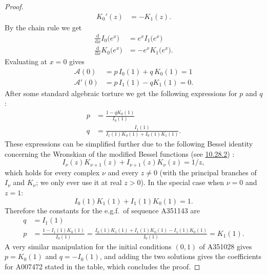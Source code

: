 \documentclass[a4paper]{amsart}
\numberwithin{equation}{section}
\begin{document}
\begin{proof}
\begin{equation}
\begin{aligned}
K_0'(z) &= -K_1(z). 
\end{aligned}
\end{equation}
%
By the chain rule we get
%
\begin{equation*}
    \begin{aligned}
        \tfrac{\mathrm{d}}{\mathrm{d}x}I_0\bigl(e^x\bigr) &= e^xI_1\bigl(e^x\bigr) \\
        \tfrac{\mathrm{d}}{\mathrm{d}x}K_0\bigl(e^x\bigr) &= -e^xK_1\bigl(e^x\bigr). 
    \end{aligned}
\end{equation*}
%
Evaluating at $x=0$ gives
%
\[
\begin{aligned}
\mathcal{A}(0) & = p \,I_0(1)+q\,K_0(1) = 1 \\
\mathcal{A}'(0) & = p\,I_1(1)-q K_1(1) = 0.
\end{aligned}
\]
%
After some standard algebraic torture we get the following expressions for $p$ and $q$:
%
\[
\begin{aligned}
p &= \frac{1-qK_0(1)}{I_0(1)} \\
q &= \frac{I_1(1)}{I_1(1)K_0(1)+I_0(1)K_1(1)}.
\end{aligned}
\]
%
These expressions can be simplified further due to the following Bessel identity concerning the Wronskian of the modified Bessel functions (see \href{https://dlmf.nist.gov/10.28.E2}{10.28.2}) \cite{NIST:DLMF}:
%
\begin{equation}\label{eq-bessel-wronskian-general}
    I_\nu(z)K_{\nu+1}(z)+I_{\nu+1}(z)K_\nu(z) = 1/z,
\end{equation}
%
which holds for every complex $\nu$ and every $z \neq 0$ (with the principal branches of $I_\nu$ and $K_\nu$; we only ever use it at real $z > 0$). In the special case when $\nu = 0$ and $z=1$:
%
\begin{equation}\label{eq-bessel-wronskian}
I_0(1)K_1(1)+I_1(1)K_0(1) = 1.
\end{equation}
%
Therefore the constants for the e.g.f.\ of sequence A351143 are
%
\[
\begin{aligned}
q &= I_1(1) \\
p &= \frac{1 - I_1(1)K_0(1)}{I_0(1)} = \frac{I_0(1)K_1(1)+I_1(1)K_0(1) - I_1(1)K_0(1)}{I_0(1)} = K_1(1).
\end{aligned}
\]
%
A very similar manipulation for the initial conditions $(0,1)$ of A351028 gives $p = K_0(1)$ and $q = -I_0(1)$, and adding the two solutions gives the coefficients for A007472 stated in the table, which concludes the proof.
\end{proof}
\end{document}
